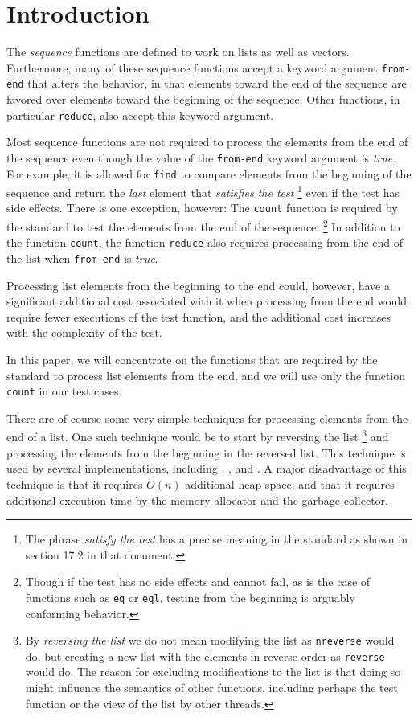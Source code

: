 \section{Introduction}

The \commonlisp{} \emph{sequence} functions are defined to work on
lists as well as vectors.  Furthermore, many of these sequence
functions accept a keyword argument \texttt{from-end} that alters the
behavior, in that elements toward the end of the sequence are favored
over elements toward the beginning of the sequence.  Other functions,
in particular \texttt{reduce}, also accept this keyword argument.

Most sequence functions are not required to process the elements from
the end of the sequence even though the value of the \texttt{from-end}
keyword argument is \emph{true}.  For example, it is allowed for
\texttt{find} to compare elements from the beginning of the sequence
and return the \emph{last} element that \emph{satisfies the test}%
\footnote{The phrase \emph{satisfy the test} has a precise meaning in
  the \commonlisp{} standard as shown in section 17.2 in that
  document.}  even if the test has side effects.  There is one
exception, however: The \texttt{count} function is required by the
standard to test the elements from the end of the sequence.%
\footnote{Though if the test has no side effects and cannot fail, as
  is the case of functions such as \texttt{eq} or \texttt{eql},
  testing from the beginning is arguably conforming behavior.}
In addition to the function \texttt{count}, the function
\texttt{reduce} also requires processing from the end of the list when
\texttt{from-end} is \emph{true}.

Processing list elements from the beginning to the end could, however,
have a significant additional cost associated with it when processing
from the end would require fewer executions of the test function, and
the additional cost increases with the complexity of the test.

In this paper, we will concentrate on the functions that are required
by the standard to process list elements from the end, and we will use
only the function \texttt{count} in our test cases.

There are of course some very simple techniques for processing elements
from the end of a list.
One such technique would be to start by reversing the list%
\footnote{By \emph{reversing the list} we do not mean modifying the
  list as \texttt{nreverse} would do, but creating a new list with the
  elements in reverse order as \texttt{reverse} would do.  The reason
  for excluding modifications to the list is that doing so might
  influence the semantics of other functions, including perhaps the
  test function or the view of the list by other threads.}  and
processing the elements from the beginning in the reversed list.  This
technique is used by several implementations, including \sbcl{},
\ccl{}, and \lispworks{}.  A major disadvantage of this technique is
that it requires $O(n)$ additional heap space, and that it requires
additional execution time by the memory allocator and the garbage
collector.

